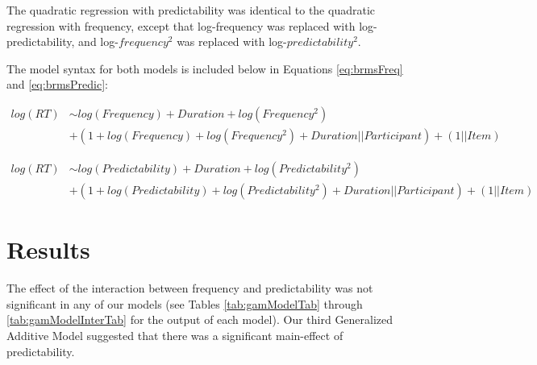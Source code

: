 \documentclass[
  man,floatsintext]{apa6}
\begin{document}
The quadratic regression with predictability was identical to the quadratic regression with frequency, except that log-frequency was replaced with log-predictability, and log-\(frequency^2\) was replaced with log-\(predictability^2.\)

The model syntax for both models is included below in Equations \eqref{eq:brmsFreq} and \eqref{eq:brmsPredic}:

\begin{equation}
\begin{aligned}
\label{eq:brmsFreq}
log(RT) & \sim log(Frequency) + Duration + log(Frequency^2) \\ & + (1 + log(Frequency) + log(Frequency^2) + Duration || Participant) + (1 || Item)
\end{aligned}
\end{equation}

\begin{equation}
\begin{aligned}
\label{eq:brmsPredic}
log(RT) & \sim  log(Predictability) + Duration + log(Predictability^2) \\ & + (1 + log(Predictability) + log(Predictability^2) + Duration || Participant) + (1 || Item)
\end{aligned}
\end{equation}

\hypertarget{results}{%
\section{Results}\label{results}}

The effect of the interaction between frequency and predictability was not significant in any of our models (see Tables \ref{tab:gamModelTab} through \ref{tab:gamModelInterTab} for the output of each model). Our third Generalized Additive Model suggested that there was a significant main-effect of predictability.
\end{document}
